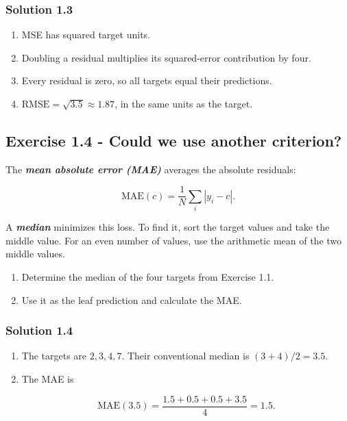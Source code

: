 \documentclass[10pt]{article}
\begin{document}
\subsubsection*{Solution 1.3}
\begin{enumerate}
\item
MSE has squared target units.

\item
Doubling a residual multiplies its squared-error contribution by
four.

\item
Every residual is zero, so all targets equal their predictions.

\item
$\mathrm{RMSE}=\sqrt{3.5}\approx1.87$, in the same units as the
target.

\end{enumerate}
\par\endgroup

\subsection*{Exercise 1.4 - Could we use another criterion?}
The \textbf{\textit{mean absolute error (MAE)}} averages the absolute residuals:

\[
\mathrm{MAE}(c)=\frac1N\sum_i |y_i-c|.
\]

A \textbf{\textit{median}} minimizes this loss. To find it, sort the target values and take the middle value. For an even number of values, use the arithmetic mean of the two middle values.

\begin{enumerate}
\item
Determine the median of the four targets from Exercise 1.1.

\item
Use it as the leaf prediction and calculate the MAE.

\end{enumerate}
\begingroup\color{red}

\subsubsection*{Solution 1.4}
\begin{enumerate}
\item
The targets are $2,3,4,7$. Their conventional median is
$(3+4)/2=3.5$.

\item
The MAE is

\[
\mathrm{MAE}(3.5)=\frac{1.5+0.5+0.5+3.5}{4}=1.5.
\]

\end{enumerate}
\par\endgroup
\end{document}
